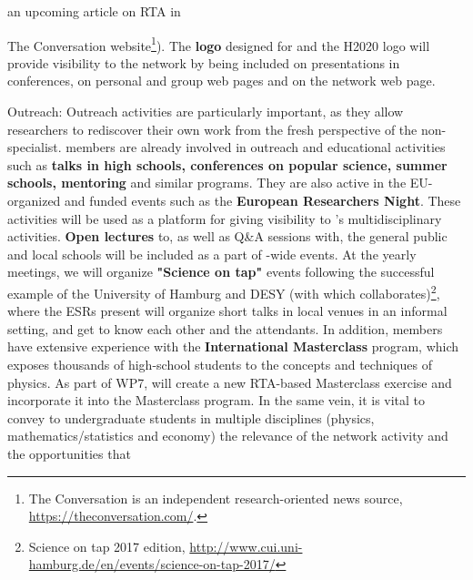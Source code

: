 an upcoming article on RTA in {The Conversation website\footnote{
The Conversation is an independent research-oriented news source, \url{https://theconversation.com/}.}). 
The \textbf{logo} designed for \acronym and the H2020 logo will provide visibility to the network by being included on
presentations in conferences, %
on personal and group web pages and on the network web page. 

\color{blue}Outreach: \color{black} 
Outreach activities are particularly important,
as they allow researchers to rediscover their own work from the fresh perspective
of the non-specialist. 
\acronym members are already involved in outreach and educational
activities such as \textbf{talks in high schools, conferences on popular science,
summer schools, mentoring} and similar programs. They are also
active in the EU-organized and funded events such as the \textbf{European Researchers Night}. 
These activities will be used as a platform for giving visibility to \acronym's multidisciplinary
activities. \textbf{Open lectures} to, as well
as Q\&A sessions with, the general public and local schools will be included as a
part of \acronym-wide events. 
At the yearly meetings, we will organize \textbf{"Science on tap"} events
following the successful example of the University of Hamburg and DESY (with 
which \lundentity collaborates)\footnote{Science on tap 2017 edition, \url{http://www.cui.uni-hamburg.de/en/events/science-on-tap-2017/}}, where the ESRs present will organize short talks 
in local venues in an informal setting, and get to know each other and 
the attendants.  
In addition, \acronym members have extensive experience with the
\textbf{International Masterclass}
program, which exposes thousands of high-school students to the
concepts and techniques of physics. As part of WP7, \acronym will
create a new RTA-based Masterclass exercise and incorporate it into the Masterclass program.  
In the same vein, it is vital to convey to undergraduate students in
multiple disciplines (physics, mathematics/statistics and economy) the
relevance of the \acronym network activity and the opportunities that
}
